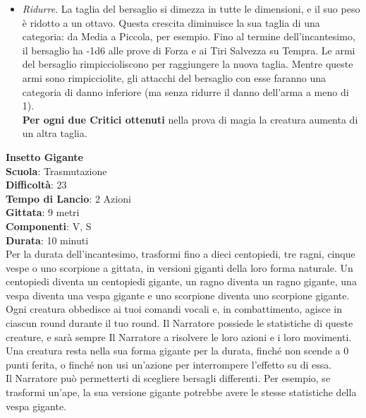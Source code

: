 \begin{multicols}{2}
\begin{itemize}
\item
\textit{Ridurre}. La taglia del bersaglio si dimezza in tutte le dimensioni, e il suo peso è ridotto a un ottavo. Questa crescita diminuisce la sua taglia di una categoria: da Media a Piccola, per esempio. Fino al termine dell'incantesimo, il bersaglio ha -1d6 alle prove di Forza e ai Tiri Salvezza su Tempra. Le armi del bersaglio rimpiccioliscono per raggiungere la nuova taglia. Mentre queste armi sono rimpicciolite, gli attacchi del bersaglio con esse faranno una categoria di danno inferiore (ma senza ridurre il danno dell'arma a meno di 1).\\
\textbf{Per ogni due Critici ottenuti} nella prova di magia la creatura aumenta di un altra taglia.

\end{itemize}

\medskip\textbf{Insetto Gigante}\\
\textbf{Scuola}: Trasmutazione\\
\textbf{Difficoltà}: 23\\
\textbf{Tempo di Lancio}: 2 Azioni\\
\textbf{Gittata}: 9 metri\\
\textbf{Componenti}: V, S\\
\textbf{Durata}: 10 minuti\\
Per la durata dell'incantesimo, trasformi fino a dieci centopiedi, tre ragni, cinque vespe o uno scorpione a gittata, in versioni giganti della loro forma naturale. Un centopiedi diventa un centopiedi gigante, un ragno diventa un ragno gigante, una vespa diventa una vespa gigante e uno scorpione diventa uno scorpione gigante. Ogni creatura obbedisce ai tuoi comandi vocali e, in combattimento, agisce in ciascun round durante il tuo round. Il Narratore possiede le statistiche di queste creature, e sarà sempre Il Narratore a risolvere le loro azioni e i loro movimenti. Una creatura resta nella sua forma gigante per la durata, finché non scende a 0 punti ferita, o finché non usi un'azione per interrompere l'effetto su di essa.\\
Il Narratore può permetterti di scegliere bersagli differenti. Per esempio, se trasformi un'ape, la sua versione gigante potrebbe avere le stesse statistiche della vespa gigante.


\end{multicols}
